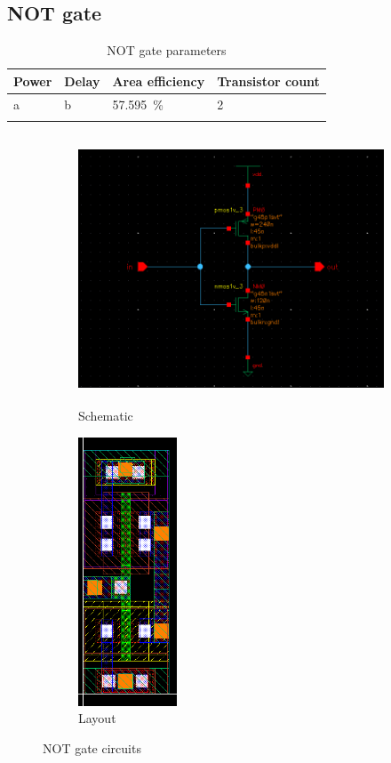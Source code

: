 \subsection{NOT gate}
\begin{xltabular}{\textwidth}{YYYY}
    Power & Delay & Area efficiency & Transistor count \\
    \hline
    a & b & \qty{57.595}{\percent} & 2 \\
    \hline    
    \caption{NOT gate parameters}
\end{xltabular}
\begin{figure}[H]
\begin{subfigure}{0.6\textwidth}
    \centering
    \includegraphics[width=\textwidth,height=8cm,keepaspectratio]{./figures/inverter/schematic.png}
    \caption{Schematic}\label{fig:notschematic}
\end{subfigure}
\hfill
\begin{subfigure}{0.4\textwidth}
    \centering
    \includegraphics[width=\textwidth,height=8cm,keepaspectratio]{./figures/inverter/layout.png}
    \caption{Layout}\label{fig:notlayout}
\end{subfigure}
\caption{NOT gate circuits}
\end{figure}

